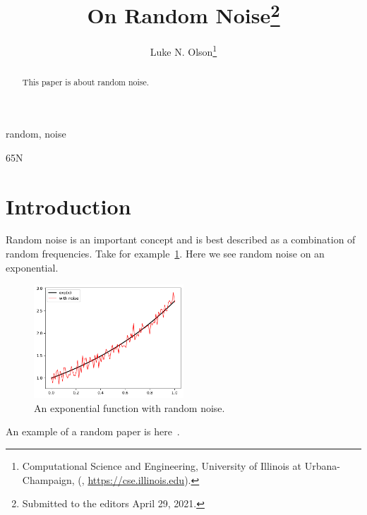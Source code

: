 \documentclass[review,onefignum,onetabnum]{siamart190516}
\title{On Random Noise\thanks{Submitted to the editors April 29, 2021.
\funding{This work was funded by CSE.}}}
\author{Luke N. Olson\thanks{Computational Science and Engineering, University of Illinois at Urbana-Champaign,
(\email{lukeo@illinois.edu}, \url{https://cse.illinois.edu}).}}
\begin{document}
\maketitle

\begin{abstract} This paper is about random noise.
\end{abstract}

\begin{keywords}
  random, noise
\end{keywords}

\begin{AMS}
  65N
\end{AMS}

\section{Introduction}

Random noise is an important concept and is best described as a combination of random frequencies.  Take for example~\cref{fig:exp_with_noise}.  Here we see random noise on an exponential.
%
\begin{figure}[!ht]
  \centering
  \includegraphics[width=0.5\textwidth]{./figures/exp_with_noise.pdf}
  \caption{An exponential function with random noise.}\label{fig:exp_with_noise}
\end{figure}

An example of a random paper is here~\cite{ChOlSe_2021_lsrbm}.



\end{document}

